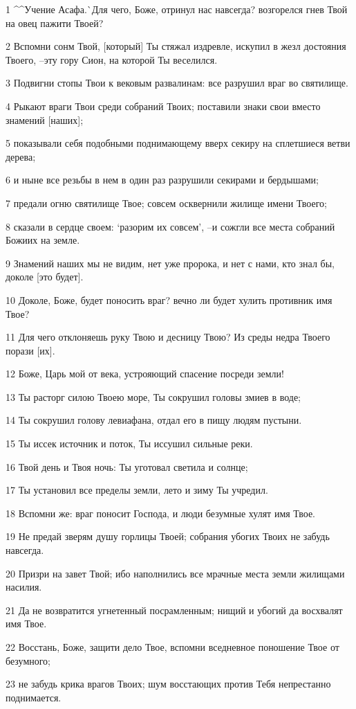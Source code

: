 \par 1 ^^Учение Асафа.^^ Для чего, Боже, отринул нас навсегда? возгорелся гнев Твой на овец пажити Твоей?
\par 2 Вспомни сонм Твой, [который] Ты стяжал издревле, искупил в жезл достояния Твоего, --эту гору Сион, на которой Ты веселился.
\par 3 Подвигни стопы Твои к вековым развалинам: все разрушил враг во святилище.
\par 4 Рыкают враги Твои среди собраний Твоих; поставили знаки свои вместо знамений [наших];
\par 5 показывали себя подобными поднимающему вверх секиру на сплетшиеся ветви дерева;
\par 6 и ныне все резьбы в нем в один раз разрушили секирами и бердышами;
\par 7 предали огню святилище Твое; совсем осквернили жилище имени Твоего;
\par 8 сказали в сердце своем: `разорим их совсем', --и сожгли все места собраний Божиих на земле.
\par 9 Знамений наших мы не видим, нет уже пророка, и нет с нами, кто знал бы, доколе [это будет].
\par 10 Доколе, Боже, будет поносить враг? вечно ли будет хулить противник имя Твое?
\par 11 Для чего отклоняешь руку Твою и десницу Твою? Из среды недра Твоего порази [их].
\par 12 Боже, Царь мой от века, устрояющий спасение посреди земли!
\par 13 Ты расторг силою Твоею море, Ты сокрушил головы змиев в воде;
\par 14 Ты сокрушил голову левиафана, отдал его в пищу людям пустыни.
\par 15 Ты иссек источник и поток, Ты иссушил сильные реки.
\par 16 Твой день и Твоя ночь: Ты уготовал светила и солнце;
\par 17 Ты установил все пределы земли, лето и зиму Ты учредил.
\par 18 Вспомни же: враг поносит Господа, и люди безумные хулят имя Твое.
\par 19 Не предай зверям душу горлицы Твоей; собрания убогих Твоих не забудь навсегда.
\par 20 Призри на завет Твой; ибо наполнились все мрачные места земли жилищами насилия.
\par 21 Да не возвратится угнетенный посрамленным; нищий и убогий да восхвалят имя Твое.
\par 22 Восстань, Боже, защити дело Твое, вспомни вседневное поношение Твое от безумного;
\par 23 не забудь крика врагов Твоих; шум восстающих против Тебя непрестанно поднимается.

